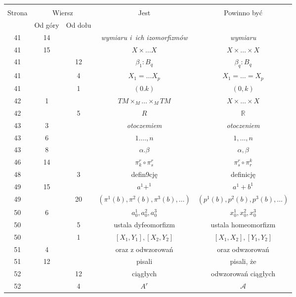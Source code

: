 \documentclass[a4paper,11pt]{article}
\newcommand{\mb}{\mathbb}
\newcommand{\mc}{\mathcal}
\newcommand{\ld}{\ldots}
\newcommand{\ti}{\times}
\newcommand{\al}{\alpha}
\newcommand{\be}{\beta}
\newcommand{\R}{\mb{R}}
\newcommand{\A}{\mc{A}}
\begin{document}
\begin{center}
  \begin{tabular}{|c|c|c|c|c|}
    \hline
    & \multicolumn{2}{c|}{} & & \\
    Strona & \multicolumn{2}{c|}{Wiersz}& Jest
                              & Powinno być \\ \cline{2-3}
    & Od góry & Od dołu &  &  \\ \hline
    41 & 14 & & \emph{wymiaru i~ich izomorfizmów} & \emph{wymiaru} \\
    41 & 15 & & $X \ti \ld X$ & $X \ti \ld \ti X$ \\
    41 & & 12 & $\be_{ 1 } : B_{ q }$ & $\be_{ q } : B_{ q }$ \\
    41 & &  4 & $X_{ 1 } = \ld X_{ p }$ & $X_{ 1 } = \ld = X_{ p }$ \\
    41 & &  1 & $( 0. k )$ & $( 0, k )$ \\
    42 & 1 & & $TM \ti_{ M } \ld \ti_{ M } TM$ & $X \ti \ld \ti X$ \\
    42 & & 5 & $R$ & $\R$ \\
    43 &  3 & & \emph{otoczemiem} & \emph{otoczeniem} \\
    43 &  6 & & $1 . \ld, n$ & $1, \ld, n$ \\
    43 &  8 & & $\al. \be$ & $\al, \be$ \\
    46 & 14 & & $\pi_{ k }^{ r } \circ \pi^{ r }_{ s }$
           & $\pi_{ s }^{ r } \circ \pi^{ k }_{ r }$ \\
    48 & & 3 & defin9cję & definicję \\
    49 & 15 & & $a^{ 1 } + ^{ 1 }$ & $a^{ 1 } + b^{ 1 }$ \\
    49 & & 20 & $( \pi^{ 1 } ( b ), \pi^{ 2 } ( b ), \pi^{ 3 } ( b ),
                \ld )$ & $( p^{ 1 } ( b ), p^{ 2 } ( b ),
                         p^{ 3 } ( b ), \ld )$ \\
    50 & 6 & & $a_{ 0 }^{ 1 }, a_{ 0 }^{ 2 }, a_{ 0 }^{ 3 }$
           & $x_{ 0 }^{ 1 }, x_{ 0 }^{ 2 }, x_{ 0 }^{ 3 }$ \\
    50 & & 5 & ustala dyfeomorfizm & ustala homeomorfizm \\
    50 & & 1 & $[ X_{ 1 }, Y_{ 1 }], [ X_{ 2 }, Y_{ 2 } ]$
           & $[ X_{ 1 }, X_{ 2 }], [ Y_{ 1 }, Y_{ 2 } ]$ \\
    51 &  4 & & oraz z odwzorowań & oraz odwzorowań \\
    51 & 12 & & pisali & pisali, że \\
    52 & & 12 & ciągłych & odwzorowań ciągłych \\
    52 & &  4 & $A^{ r }$ & $\A$ \\

\end{tabular}
\end{center}
\end{document}
